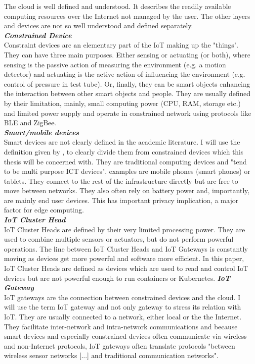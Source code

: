 The cloud is well defined and understood. It describes the readily available computing resources over the Internet not managed by the user. The other layers and devices are not so well understood and defined separately.\\[5mm]
\textbf{\textit{Constrained Device}}\\
Constraint devices are an elementary part of the IoT making up the "things"\cite{contstraintDevicesTerminology}.
They can have three main purposes. Either sensing or actuating (or both), where sensing is the 
passive action of measuring the environment (e.g. a motion detector) and actuating is the active action of influencing the environment (e.g. control of pressure in test tube). Or, finally, they can be smart objects enhancing the interaction between other smart objects and people.
They are usually defined by their limitation, mainly, small computing power (CPU, RAM, storage etc.) and limited power supply and operate in constrained network using protocols like BLE and ZigBee. \\[5mm]
\textbf{\textit{Smart/mobile devices}}\\
Smart devices are not clearly defined in the academic literature. I will use the definition given by \citeauthor{poslad2011smartDevices}\cite{poslad2011smartDevices}, to clearly divide them from constrained devices which this thesis will be concerned with. They are traditional computing devices and "tend to be multi purpose ICT devices"\cite{poslad2011smartDevices}, examples are mobile phones (smart phones) or tablets. They connect to the rest of the infrastructure directly but are free to move between networks. They also often rely on battery power and, importantly, are mainly end user devices. This has important privacy implication, a major factor for edge computing.\\[5mm]
\textbf{\textit{IoT Cluster Head}}\\
IoT Cluster Heads are defined by their very limited processing power. They are used to combine multiple sensors or actuators, but do not perform powerful operations. The line between IoT Cluster Heads and IoT Gateways is constantly moving as devices get more powerful and software more efficient. In this paper, IoT Cluster Heads are defined as devices which are used to read and control IoT devices but are not powerful enough to run containers or Kubernetes.
\textbf{\textit{IoT Gateway}}\\
IoT gateways are the connection between constrained devices and the cloud. I will use the term IoT gateway and not only gateway to stress its relation with IoT. They are usually connected to a network, either local or the the Internet. They facilitate inter-network and intra-network communications and because smart devices and especially constrained devices often communicate via wireless and non-Internet protocols, IoT gateways often translate protocols "between wireless sensor networks [...] and traditional communication networks"\cite{zhu2010iotGatewayDefinition}.
